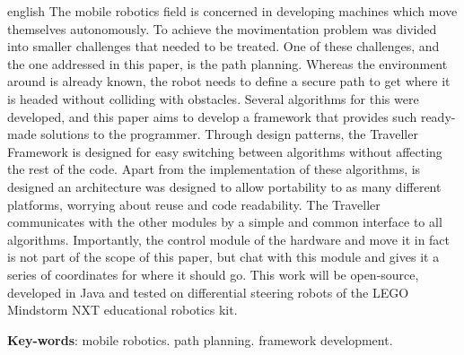 \begin{resumo}[Abstract]
 \begin{otherlanguage*}{english}
   The mobile robotics field is concerned in developing machines which move themselves autonomously. To achieve the movimentation problem was divided into smaller challenges that needed to be treated. One of these challenges, and the one addressed in this paper, is the path planning. Whereas the environment around is already known, the robot needs to define a secure path to get where it is headed without colliding with obstacles. Several algorithms for this were developed, and this paper aims to develop a framework that provides such ready-made solutions to the programmer. Through design patterns, the Traveller Framework is designed for easy switching between algorithms without affecting the rest of the code. Apart from the implementation of these algorithms, is designed an architecture was designed to allow portability to as many different platforms, worrying about reuse and code readability. The Traveller communicates with the other modules by a simple and common interface to all algorithms. Importantly, the control module of the hardware and move it in fact is not part of the scope of this paper, but chat with this module and gives it a series of coordinates for where it should go. This work will be open-source, developed in Java and tested on differential steering robots of the LEGO Mindstorm NXT educational robotics kit.

   \vspace{\onelineskip}
 
   \noindent 
   \textbf{Key-words}: mobile robotics. path planning. framework development.
 \end{otherlanguage*}
\end{resumo}
